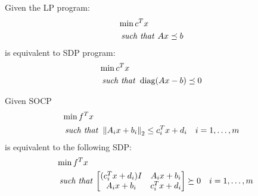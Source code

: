 \begin{proposition}
    Given the LP program: 
    \begin{equation*}
    \begin{aligned}
        &\min c^Tx \\
        &\text{\emph{ such that }} \begin{aligned}[t]
            &Ax\preceq b
        \end{aligned}
    \end{aligned}
    \end{equation*}
    is equivalent to SDP program:
    \begin{equation*}
    \begin{aligned}
        &\min c^Tx \\
        &\text{\emph{ such that }} \begin{aligned}[t]
            &\operatorname{diag}(Ax-b)\preceq0
        \end{aligned}
    \end{aligned}
    \end{equation*}
\end{proposition}

\begin{proposition}
    Given SOCP
    \begin{equation*}
    \begin{aligned}
        &\min f^Tx \\
        &\text{\emph{ such that }} \begin{aligned}[t]
            &\left\lVert A_ix+b_i\right\rVert_2\le c_i^Tx+d_i \quad i=1,\dots,m
        \end{aligned}
    \end{aligned}
    \end{equation*}
    is equivalent to the following SDP:
    \begin{equation*}
    \begin{aligned}
        &\min f^Tx \\
        &\text{\emph{ such that }} \begin{aligned}[t]
            \begin{bmatrix}
                (c_i^Tx+d_i)I & A_ix+b_i \\
                A_ix+b_i & c_i^Tx+d_i
            \end{bmatrix} \succeq 0 \quad i=1,\dots,m
        \end{aligned}
    \end{aligned}
    \end{equation*}
\end{proposition}

